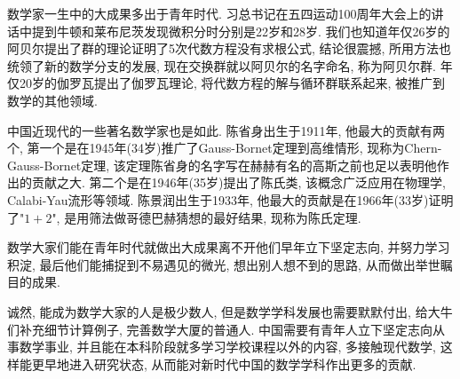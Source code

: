 数学家一生中的大成果多出于青年时代. 习总书记在五四运动100周年大会上的讲话中提到牛顿和莱布尼茨发现微积分时分别是22岁和28岁. 我们也知道年仅26岁的阿贝尔提出了群的理论证明了5次代数方程没有求根公式, 结论很震撼, 所用方法也统领了新的数学分支的发展, 现在交换群就以阿贝尔的名字命名, 称为阿贝尔群. 年仅20岁的伽罗瓦提出了伽罗瓦理论, 将代数方程的解与循环群联系起来, 被推广到数学的其他领域.

中国近现代的一些著名数学家也是如此. 陈省身出生于1911年, 他最大的贡献有两个, 第一个是在1945年(34岁)推广了Gauss-Bornet定理到高维情形, 现称为Chern-Gauss-Bornet定理, 该定理陈省身的名字写在赫赫有名的高斯之前也足以表明他作出的贡献之大. 第二个是在1946年(35岁)提出了陈氏类, 该概念广泛应用在物理学, Calabi-Yau流形等领域. 陈景润出生于1933年, 他最大的贡献是在1966年(33岁)证明了"$1 + 2$", 是用筛法做哥德巴赫猜想的最好结果, 现称为陈氏定理.

数学大家们能在青年时代就做出大成果离不开他们早年立下坚定志向, 并努力学习积淀, 最后他们能捕捉到不易遇见的微光, 想出别人想不到的思路, 从而做出举世瞩目的成果.

诚然, 能成为数学大家的人是极少数人, 但是数学学科发展也需要默默付出, 给大牛们补充细节计算例子, 完善数学大厦的普通人. 中国需要有青年人立下坚定志向从事数学事业, 并且能在本科阶段就多学习学校课程以外的内容, 多接触现代数学, 这样能更早地进入研究状态, 从而能对新时代中国的数学学科作出更多的贡献.
